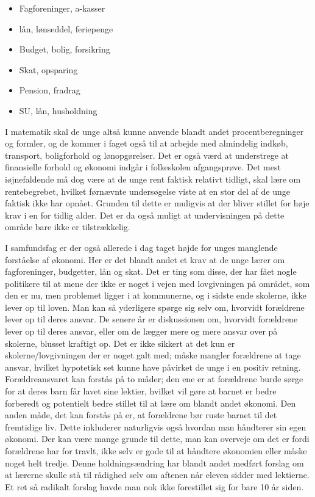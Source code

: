 \noindent \begin{itemize}
\item{Fagforeninger, a-kasser}
\item{lån, lønseddel, feriepenge}
\item{Budget, bolig, forsikring}
\item{Skat, opsparing}
\item{Pension, fradrag}
\item{SU, lån, husholdning}
\cite{FallesMalMatematik}
\end{itemize}

I matematik skal de unge altså kunne anvende blandt andet procentberegninger og formler, og de kommer i faget også til at arbejde med almindelig indkøb, transport, boligforhold og lønopgørelser. Det er også værd at understrege at finansielle forhold og økonomi indgår i folkeskolen afgangsprøve. Det mest iøjnefaldende må dog være at de unge rent faktisk relativt tidligt, skal lære om rentebegrebet, hvilket førnævnte undersøgelse viste at en stor del af de unge faktisk ikke har opnået. Grunden til dette er muligvis at der bliver stillet for høje krav i en for tidlig alder. Det er da også muligt at undervisningen på dette område bare ikke er tilstrækkelig.

I samfundsfag er der også allerede i dag taget højde for unges manglende forståelse af økonomi. Her er det blandt andet et krav at de unge lærer om fagforeninger, budgetter, lån og skat. Det er ting som disse, der har fået nogle politikere til at mene der ikke er noget i vejen med lovgivningen på området, som den er nu, men problemet ligger i at kommunerne, og i sidste ende skolerne, ikke lever op til loven\cite{BusinessDK3}. Man kan så yderligere spørge sig selv om, hvorvidt forældrene lever op til deres ansvar. De senere år er diskussionen om, hvorvidt forældrene lever op til deres ansvar, eller om de lægger mere og mere ansvar over på skolerne, blusset kraftigt op. Det er ikke sikkert at det kun er skolerne/lovgivningen der er noget galt med; måske mangler forældrene at tage ansvar, hvilket hypotetisk set kunne have påvirket de unge i en positiv retning. Forældreansvaret kan forstås på to måder; den ene er at forældrene burde sørge for at deres barn får lavet sine lektier, hvilket vil gøre at barnet er bedre forberedt og potentielt bedre stillet til at lære om blandt andet økonomi. Den anden måde, det kan forstås på er, at forældrene bør ruste barnet til det fremtidige liv. Dette inkluderer naturligvis også hvordan man håndterer sin egen økonomi. Der kan være mange grunde til dette, man kan overveje om det er fordi forældrene har for travlt, ikke selv er gode til at håndtere økonomien eller måske noget helt tredje. Denne holdningsændring har blandt andet medført forslag om at lærerne skulle stå til rådighed selv om aftenen når eleven sidder med lektierne. Et ret så radikalt forslag havde man nok ikke forestillet sig for bare 10 år siden\cite{ForaldreAnsvar}.

